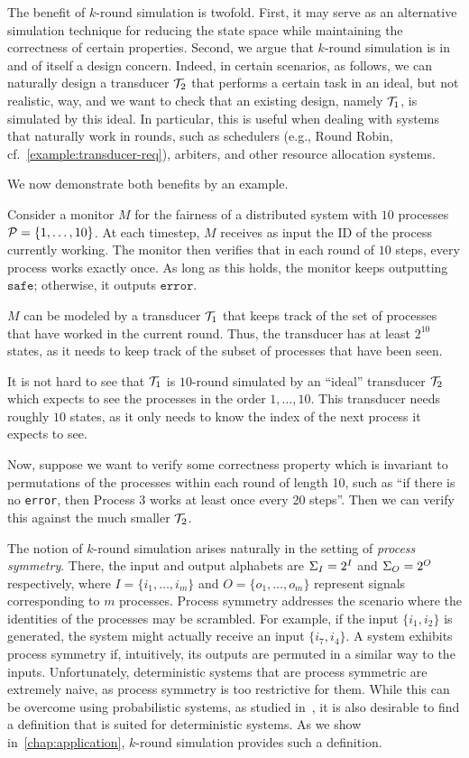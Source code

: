 The benefit of $k$-round simulation is twofold. First, it may serve as an alternative simulation technique for reducing the state space while maintaining the correctness of certain properties. Second, we argue that $k$-round simulation is in and of itself a design concern. Indeed, in certain scenarios, as follows, we can naturally design a transducer $\mathcal{T}_2$ that performs a certain task in an ideal, but not realistic, way, and we want to check that an existing design, namely $\mathcal{T}_1$, is simulated by this ideal. In particular, this is useful when dealing with systems that naturally work in rounds, such as schedulers (e.g., Round Robin, cf.~\cref{example:transducer-req}), arbiters, and other resource allocation systems.

We now demonstrate both benefits by an example.
\begin{example}
\label{example:MC_rounds}
Consider a monitor $M$ for the fairness of a distributed system with $10$ processes $\mathcal{P}=\{1,\ldots,10\}$. At each timestep, $M$ receives as input the ID of the process currently working. The monitor then verifies that in each round of $10$ steps, every process works exactly once. As long as this holds, the monitor keeps outputting $\texttt{safe}$; otherwise, it outputs $\texttt{error}$.

$M$ can be modeled by a transducer $\mathcal{T}_1$ that keeps track of the set of processes that have worked in the current round. Thus, the transducer has at least $2^{10}$ states, as it needs to keep track of the subset of processes that have been seen.

It is not hard to see that $\mathcal{T}_1$ is $10$-round simulated by an ``ideal'' transducer $\mathcal{T}_2$ which expects to see the processes in the order $1,\ldots,10$. This transducer needs roughly $10$ states, as it only needs to know the index of the next process it expects to see.

Now, suppose we want to verify some correctness property which is invariant to permutations of the processes within each round of length 10, such as ``if there is no \texttt{error}, then Process $3$ works at least once every 20 steps''. Then we can verify this against the much smaller $\mathcal{T}_2$.
\end{example}

The notion of $k$-round simulation arises naturally in the setting of \emph{process symmetry}. There, the input and output alphabets are $\Sigma_{I}=2^{I}$ and $\Sigma_{O}=2^{O}$ respectively, where $I=\{i_1,\ldots,i_m\}$ and $O=\{o_1,\ldots,o_m\}$ represent signals corresponding to $m$ processes. Process symmetry addresses the scenario where the identities of the processes may be scrambled. For example, if the input $\{i_1,i_2\}$ is generated, the system might actually receive an input $\{i_7,i_4\}$. A system exhibits process symmetry if, intuitively, its outputs are permuted in a similar way to the inputs. Unfortunately, deterministic systems that are process symmetric are extremely naive, as process symmetry is too restrictive for them. While this can be overcome using probabilistic systems, as studied in~\cite{Almagor2020b}, it is also desirable to find a definition that is suited for deterministic systems. As we show in~\cref{chap:application}, $k$-round simulation provides such a definition.


